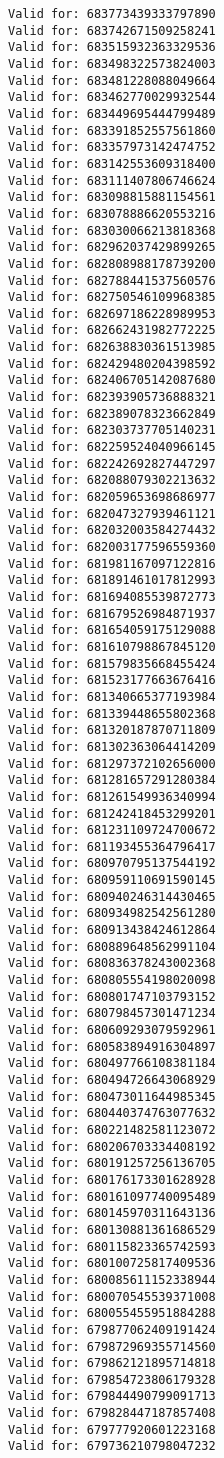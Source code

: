 \documentclass[11pt]{article}
\begin{document}
\begin{Verbatim}[commandchars=\\\{\}]
Valid for: 683773439333797890
Valid for: 683742671509258241
Valid for: 683515932363329536
Valid for: 683498322573824003
Valid for: 683481228088049664
Valid for: 683462770029932544
Valid for: 683449695444799489
Valid for: 683391852557561860
Valid for: 683357973142474752
Valid for: 683142553609318400
Valid for: 683111407806746624
Valid for: 683098815881154561
Valid for: 683078886620553216
Valid for: 683030066213818368
Valid for: 682962037429899265
Valid for: 682808988178739200
Valid for: 682788441537560576
Valid for: 682750546109968385
Valid for: 682697186228989953
Valid for: 682662431982772225
Valid for: 682638830361513985
Valid for: 682429480204398592
Valid for: 682406705142087680
Valid for: 682393905736888321
Valid for: 682389078323662849
Valid for: 682303737705140231
Valid for: 682259524040966145
Valid for: 682242692827447297
Valid for: 682088079302213632
Valid for: 682059653698686977
Valid for: 682047327939461121
Valid for: 682032003584274432
Valid for: 682003177596559360
Valid for: 681981167097122816
Valid for: 681891461017812993
Valid for: 681694085539872773
Valid for: 681679526984871937
Valid for: 681654059175129088
Valid for: 681610798867845120
Valid for: 681579835668455424
Valid for: 681523177663676416
Valid for: 681340665377193984
Valid for: 681339448655802368
Valid for: 681320187870711809
Valid for: 681302363064414209
Valid for: 681297372102656000
Valid for: 681281657291280384
Valid for: 681261549936340994
Valid for: 681242418453299201
Valid for: 681231109724700672
Valid for: 681193455364796417
Valid for: 680970795137544192
Valid for: 680959110691590145
Valid for: 680940246314430465
Valid for: 680934982542561280
Valid for: 680913438424612864
Valid for: 680889648562991104
Valid for: 680836378243002368
Valid for: 680805554198020098
Valid for: 680801747103793152
Valid for: 680798457301471234
Valid for: 680609293079592961
Valid for: 680583894916304897
Valid for: 680497766108381184
Valid for: 680494726643068929
Valid for: 680473011644985345
Valid for: 680440374763077632
Valid for: 680221482581123072
Valid for: 680206703334408192
Valid for: 680191257256136705
Valid for: 680176173301628928
Valid for: 680161097740095489
Valid for: 680145970311643136
Valid for: 680130881361686529
Valid for: 680115823365742593
Valid for: 680100725817409536
Valid for: 680085611152338944
Valid for: 680070545539371008
Valid for: 680055455951884288
Valid for: 679877062409191424
Valid for: 679872969355714560
Valid for: 679862121895714818
Valid for: 679854723806179328
Valid for: 679844490799091713
Valid for: 679828447187857408
Valid for: 679777920601223168
Valid for: 679736210798047232

\end{Verbatim}
\end{document}
